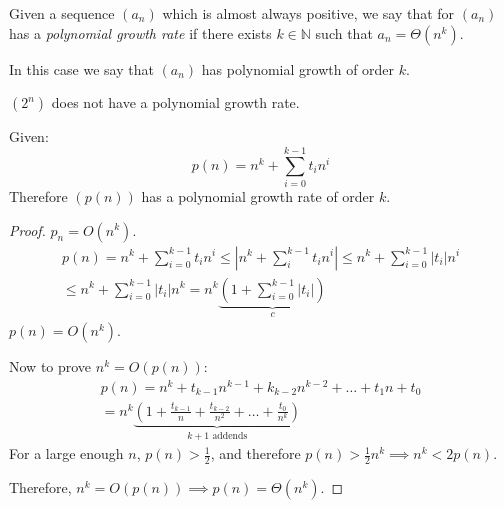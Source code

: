 \documentclass[00_complete]{subfiles}
\begin{document}
\begin{definition}
    Given a sequence $(a_n)$ which is almost always positive, we say that for
    $(a_n)$ has a \emph{polynomial growth rate} if there exists $k \in
    \mathbb{N}$ such that $a_n = \Theta(n^k)$.

    In this case we say that $(a_n)$ has polynomial growth of order $k$.
\end{definition}
\begin{example}
    $(2^n)$ does not have a polynomial growth rate.
\end{example}
\begin{claim}
    Given:
    \[
        p(n)=n^k + \sum_{i=0}^{k-1}t_in^i
    \]
    Therefore $(p(n))$ has a polynomial growth rate of order $k$.
    \begin{proof}
        $p_n = O(n^k)$.
        \begin{gather*}
            p(n)=n^k + \sum_{i=0}^{k-1}t_in^i \leq \left|n^k +
            \sum_{i}^{k-1}t_in^i\right| \leq n^k + \sum_{i=0}^{k-1}|t_i|n^i \\
            \leq n^k + \sum_{i=0}^{k-1}|t_i|n^k =
            n^k\underbrace{\left(1+\sum_{i=0}^{k-1}|t_i|\right)}_{c}
        \end{gather*}
        $p(n) = O(n^k)$.

        Now to prove $n^k = O(p(n))$:
        \begin{gather*}
            p(n)=n^k + t_{k-1}n^{k-1}+k_{k-2}n^{k-2}+\dots+t_1n +t_0 \\
            =n^k\underbrace{\left(1 +
            \frac{t_{k-1}}{n}+\frac{t_{k-2}}{n^2}+\dots+\frac{t_0}{n^k}\right)}
            _{k+1 \text{ addends}}
        \end{gather*}
        For a large enough $n$, $p(n)>\frac{1}{2}$, and therefore
        $p(n)>\frac{1}{2}n^k \implies n^k < 2p(n)$.

        Therefore, $n^k=O(p(n)) \implies p(n) = \Theta(n^k)$.
    \end{proof}
\end{claim}
\end{document}
